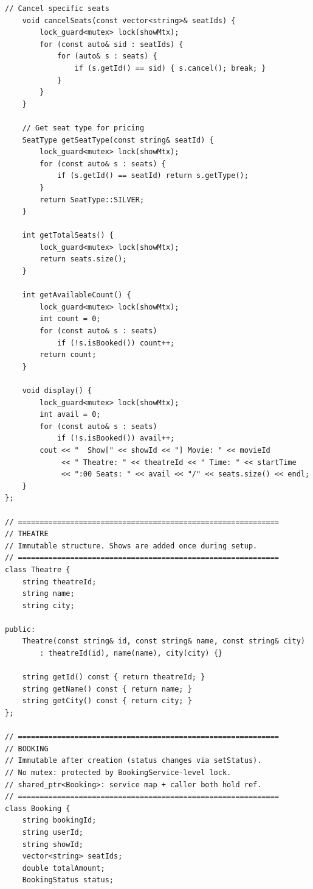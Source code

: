 \documentclass[11pt,a4paper]{article}
\begin{document}
\begin{lstlisting}[title={\texttt{models.hpp}}]
    // Cancel specific seats
    void cancelSeats(const vector<string>& seatIds) {
        lock_guard<mutex> lock(showMtx);
        for (const auto& sid : seatIds) {
            for (auto& s : seats) {
                if (s.getId() == sid) { s.cancel(); break; }
            }
        }
    }

    // Get seat type for pricing
    SeatType getSeatType(const string& seatId) {
        lock_guard<mutex> lock(showMtx);
        for (const auto& s : seats) {
            if (s.getId() == seatId) return s.getType();
        }
        return SeatType::SILVER;
    }

    int getTotalSeats() {
        lock_guard<mutex> lock(showMtx);
        return seats.size();
    }

    int getAvailableCount() {
        lock_guard<mutex> lock(showMtx);
        int count = 0;
        for (const auto& s : seats)
            if (!s.isBooked()) count++;
        return count;
    }

    void display() {
        lock_guard<mutex> lock(showMtx);
        int avail = 0;
        for (const auto& s : seats)
            if (!s.isBooked()) avail++;
        cout << "  Show[" << showId << "] Movie: " << movieId
             << " Theatre: " << theatreId << " Time: " << startTime
             << ":00 Seats: " << avail << "/" << seats.size() << endl;
    }
};

// ============================================================
// THEATRE
// Immutable structure. Shows are added once during setup.
// ============================================================
class Theatre {
    string theatreId;
    string name;
    string city;

public:
    Theatre(const string& id, const string& name, const string& city)
        : theatreId(id), name(name), city(city) {}

    string getId() const { return theatreId; }
    string getName() const { return name; }
    string getCity() const { return city; }
};

// ============================================================
// BOOKING
// Immutable after creation (status changes via setStatus).
// No mutex: protected by BookingService-level lock.
// shared_ptr<Booking>: service map + caller both hold ref.
// ============================================================
class Booking {
    string bookingId;
    string userId;
    string showId;
    vector<string> seatIds;
    double totalAmount;
    BookingStatus status;


\end{lstlisting}
\end{document}
